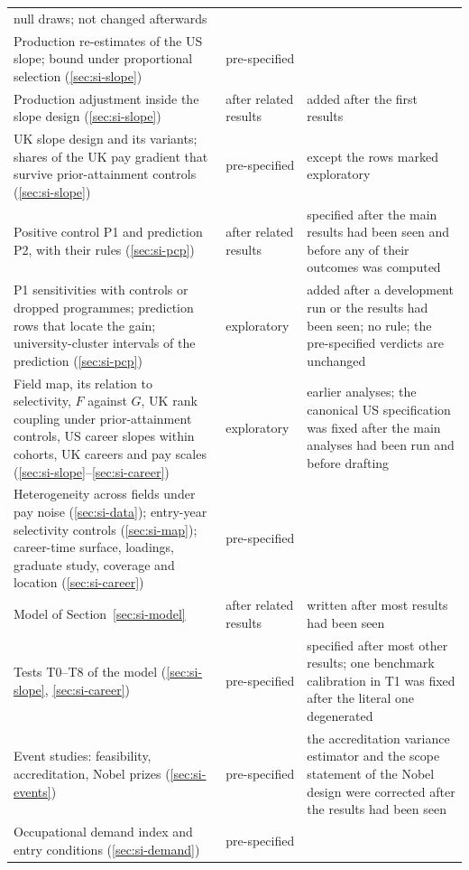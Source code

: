 \documentclass[11pt]{article}
\begin{document}
\begin{longtable}{@{}>{\raggedright\arraybackslash}p{5.6cm}>{\raggedright\arraybackslash}p{2.0cm}>{\raggedright\arraybackslash}p{8.2cm}@{}}
null draws; not changed afterwards \\
Production re-estimates of the US slope; bound under proportional selection (\ref{sec:si-slope}) & pre-specified & \\
Production adjustment inside the slope design (\ref{sec:si-slope}) & after related results & added after the first
results \\
UK slope design and its variants; shares of the UK pay gradient that survive prior-attainment controls
(\ref{sec:si-slope}) & pre-specified & except the rows marked exploratory \\
Positive control P1 and prediction P2, with their rules (\ref{sec:si-pcp}) & after related results & specified after
the main results had been seen and before any of their outcomes was computed \\
P1 sensitivities with controls or dropped programmes; prediction rows that locate the gain; university-cluster
intervals of the prediction (\ref{sec:si-pcp}) & exploratory & added after a development run or the results had been seen; no rule; the
pre-specified verdicts are unchanged \\
Field map, its relation to selectivity, $F$ against $G$, UK rank coupling under prior-attainment controls, US career
slopes within cohorts, UK careers and pay scales (\ref{sec:si-slope}--\ref{sec:si-career}) & exploratory & earlier analyses; the canonical US specification was fixed
after the main analyses had been run and before drafting \\
Heterogeneity across fields under pay noise (\ref{sec:si-data}); entry-year selectivity controls
(\ref{sec:si-map}); career-time surface, loadings, graduate study, coverage and location (\ref{sec:si-career}) &
pre-specified & \\
Model of Section~\ref{sec:si-model} & after related results & written after most results had been seen \\
Tests T0--T8 of the model (\ref{sec:si-slope}, \ref{sec:si-career}) & pre-specified & specified after most other
results; one benchmark calibration in T1 was fixed after the literal one degenerated \\
Event studies: feasibility, accreditation, Nobel prizes (\ref{sec:si-events}) & pre-specified & the accreditation
variance estimator and the scope statement of the Nobel design were corrected after the results had been seen \\
Occupational demand index and entry conditions (\ref{sec:si-demand}) & pre-specified & \\

\end{longtable}
\end{document}
